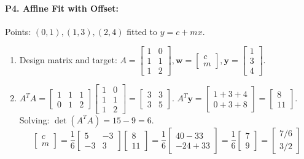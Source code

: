 \paragraph{P4. Affine Fit with Offset:}
Points: $(0, 1), (1, 3), (2, 4)$ fitted to $y = c + m x$.
\begin{enumerate}[label=(\alph*)]
    \item Design matrix and target: $A = \begin{bmatrix} 1 & 0 \\ 1 & 1 \\ 1 & 2 \end{bmatrix}, \mathbf{w} = \begin{bmatrix} c \\ m \end{bmatrix}, \mathbf{y} = \begin{bmatrix} 1 \\ 3 \\ 4 \end{bmatrix}$.
    \item $A^T A = \begin{bmatrix} 1 & 1 & 1 \\ 0 & 1 & 2 \end{bmatrix} \begin{bmatrix} 1 & 0 \\ 1 & 1 \\ 1 & 2 \end{bmatrix} = \begin{bmatrix} 3 & 3 \\ 3 & 5 \end{bmatrix}$.
    $A^T \mathbf{y} = \begin{bmatrix} 1+3+4 \\ 0+3+8 \end{bmatrix} = \begin{bmatrix} 8 \\ 11 \end{bmatrix}$.
    Solving: $\det(A^T A) = 15 - 9 = 6$.
    \begin{equation*}
    \begin{bmatrix} c \\ m \end{bmatrix} = \frac{1}{6} \begin{bmatrix} 5 & -3 \\ -3 & 3 \end{bmatrix} \begin{bmatrix} 8 \\ 11 \end{bmatrix} = \frac{1}{6} \begin{bmatrix} 40 - 33 \\ -24 + 33 \end{bmatrix} = \frac{1}{6} \begin{bmatrix} 7 \\ 9 \end{bmatrix} = \begin{bmatrix} 7/6 \\ 3/2 \end{bmatrix}

\end{equation*}
\end{enumerate}
